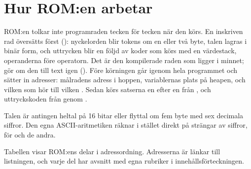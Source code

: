 \documentclass[10pt,oneside]{report}
\begin{document}
\section*{Hur ROM:en arbetar}
\par\noindent ROM:en tolkar inte programraden tecken för tecken när den körs. En inskriven rad översätts först (): nyckelorden blir tokens om en eller två byte, talen lagras i binär form, och uttrycken blir en följd av koder som körs med en värdestack, operanderna före operatorn. Det är den kompilerade raden som ligger i minnet;  gör om den till text igen (). Före körningen går  igenom hela programmet och sätter in adresser: målradens adress i hoppen, variablernas plats på heapen, och vilken  som hör till vilken . Sedan körs satserna en efter en från , och uttryckskoden från  genom .
\par\noindent Talen är antingen heltal på 16 bitar eller flyttal om fem byte med sex decimala siffror. Den egna ASCII-aritmetiken räknar i stället direkt på strängar av siffror, för  och de andra.
\par\noindent Tabellen visar ROM:ens delar i adressordning. Adresserna är länkar till listningen, och varje del har avsnitt med egna rubriker i innehållsförteckningen.\par\medskip
\end{document}
